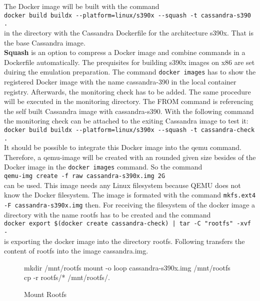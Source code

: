 The Docker image will be built with the command  \\
\lstinline!docker build buildx --platform=linux/s390x --squash -t cassandra-s390 .! \\
in the directory with the Cassandra Dockerfile  for the architecture s390x. That is the base Cassandra image.\\
\textbf{Squash} is an option to compress a Docker image and combine commands in a Dockerfile automatically. The prequisites for building s390x images on x86 are set duiring the emulation preparation. The command \lstinline!docker images! has to show the registered Docker image with the name cassandra-390 in the local container registry. Afterwards, the monitoring check has to be added. 
The same procedure will be executed in the monitoring directory. The FROM command is referencing the self built Cassandra image with cassandra-s390. With the following command the monitoring check can be attached to the exiting Cassandra image to test it: \\
\lstinline!docker build buildx --platform=linux/s390x --squash -t cassandra-check .! \\
It should be possible to integrate this Docker image into the qemu command. Therefore, a qemu-image will be created with an rounded given size besides of the Docker image in the  \lstinline!docker images! command. So the command \\  
\lstinline!qemu-img create -f raw cassandra-s390x.img 2G!  \\
can be used. This image needs any Linux filesystem because QEMU does not know the Docker filesystem. The image is formated with the command  \lstinline!mkfs.ext4 -F cassandra-s390x.img! then. For receiving the filesystem of the docker image a directory with the name rootfs has to be created and the command \\
\lstinline!docker export $(docker create cassandra-check) | tar -C "rootfs" -xvf -!  \\ 
is exporting the docker image into the directory rootfs. Following transfers the content of rootfs into the image cassandra.img.

\begin{figure}[H]
\centering
\begin{boxedverbatim}
mkdir /mnt/rootfs
mount -o loop cassandra-s390x.img /mnt/rootfs
cp -r rootfs/* /mnt/rootfs/.
\end{boxedverbatim}
 \caption{Mount Rootfs}
    \label{Mount-Rootfs}
\end{figure}

